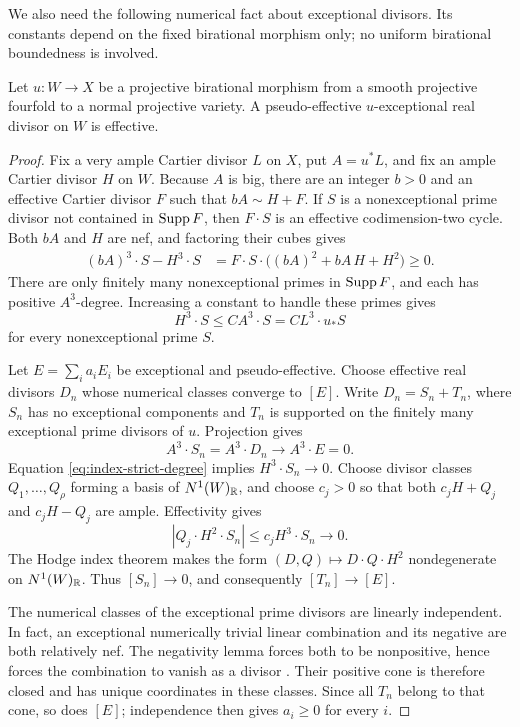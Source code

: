 We also need the following numerical fact about exceptional divisors.
Its constants depend on the fixed birational morphism only; no uniform
birational boundedness is involved.

\begin{lemma}\label{lem:index-exceptional-psef}
Let \(u:W\to X\) be a projective birational morphism from a smooth
projective fourfold to a normal projective variety.  A pseudo-effective
\(u\)-exceptional real divisor on \(W\) is effective.
\end{lemma}

\begin{proof}
Fix a very ample Cartier divisor \(L\) on \(X\), put \(A=u^*L\), and
fix an ample Cartier divisor \(H\) on \(W\).  Because \(A\) is big,
there are an integer \(b>0\) and an effective Cartier divisor \(F\)
such that \(bA\sim H+F\).  If \(S\) is a nonexceptional prime divisor
not contained in \(\operatorname{Supp} F\), then \(F\cdot S\) is an effective
codimension-two cycle.  Both \(bA\) and \(H\) are nef, and factoring
their cubes gives
\[
 \begin{split}
 (bA)^3\cdot S-H^3\cdot S
   &=F\cdot S\cdot\bigl((bA)^2+bA\,H+H^2\bigr)\ge0.
 \end{split}
\]
There are only finitely many nonexceptional primes in \(\operatorname{Supp} F\), and
each has positive \(A^3\)-degree.  Increasing a constant to handle these
primes gives
\begin{equation}\label{eq:index-strict-degree}
              H^3\cdot S\le C A^3\cdot S
                    =C L^3\cdot u_*S
\end{equation}
for every nonexceptional prime \(S\).

Let \(E=\sum_i a_iE_i\) be exceptional and pseudo-effective.  Choose
effective real divisors \(D_n\) whose numerical classes converge to
\([E]\).  Write \(D_n=S_n+T_n\), where \(S_n\) has no exceptional
components and \(T_n\) is supported on the finitely many exceptional
prime divisors of \(u\).  Projection gives
\[
      A^3\cdot S_n=A^3\cdot D_n\longrightarrow A^3\cdot E=0.
\]
Equation \eqref{eq:index-strict-degree} implies \(H^3\cdot S_n\to0\).
Choose divisor classes \(Q_1,\ldots,Q_\rho\) forming a basis of
\(N^1(W)_{\mathbb R}\), and choose \(c_j>0\) so that both
\(c_jH+Q_j\) and \(c_jH-Q_j\) are ample.  Effectivity gives
\[
       |Q_j\cdot H^2\cdot S_n|\le c_j H^3\cdot S_n\longrightarrow0.
\]
The Hodge index theorem makes the form
\((D,Q)\mapsto D\cdot Q\cdot H^2\) nondegenerate on
\(N^1(W)_{\mathbb R}\).  Thus \([S_n]\to0\), and consequently
\([T_n]\to[E]\).

The numerical classes of the exceptional prime divisors are linearly
independent.  In fact, an exceptional numerically trivial linear
combination and its negative are both relatively nef.  The negativity
lemma forces both to be nonpositive, hence forces the combination to
vanish as a divisor \cite[Lemma~3.39]{KollarMori1998}.  Their positive
cone is therefore closed and has unique coordinates in these classes.
Since all \(T_n\) belong to that cone, so does \([E]\); independence
then gives \(a_i\ge0\) for every \(i\).
\end{proof}

